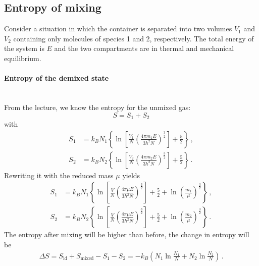 \newpage
\subsection{Entropy of mixing}
    Consider a situation in which the container is separated into two volumes 
    $V_1$ and $V_2$ containing only molecules of species 1 and 2, respectively. 
    The total energy of the system is $E$ and the two compartments are in 
    thermal and mechanical equilibrium. 

\paragraph{Entropy of the demixed state} \ \\
    From the lecture, we know the entropy for the unmixed gas:
    \begin{equation}
        S = S_1 + S_2
    \end{equation}
    with 
    \begin{align}
    S_1 &= k_B N_1 \left\{ \ln\left[ \frac{V_1}{N} \left( \frac{4\pi m_1 E}{3h^2N} \right)^{\frac{3}{2}}  \right] + \frac{5}{2} \right\} \,, \\
    S_2 &= k_B N_2 \left\{ \ln\left[ \frac{V_2}{N} \left( \frac{4\pi m_2 E}{3h^2N} \right)^{\frac{3}{2}}  \right] + \frac{5}{2} \right\} \,.
    \end{align}
    Rewriting it with the reduced mass $\mu$ yields
    \begin{align}
    S_1 &= k_B N_1 \left\{ \ln\left[ \frac{V}{N} \left( \frac{4\pi \mu E}{3h^2N} \right)^{\frac{3}{2}}  \right] + \frac{5}{2} + \ln\left( \frac{m_1}{\mu} \right)^{\frac{3}{2}} \right\} \,, \\
    S_2 &= k_B N_2 \left\{ \ln\left[ \frac{V}{N} \left( \frac{4\pi \mu E}{3h^2N} \right)^{\frac{3}{2}}  \right] + \frac{5}{2} + \ln\left( \frac{m_2}{\mu} \right)^{\frac{3}{2}} \right\} \,.
    \end{align}
    The entropy after mixing will be higher than before, the change in entropy will be
    \begin{align}
    \Delta S = S_{\text{id}} + S_{\text{mixed}} - S_1 - S_2 = - k_B \left( N_1 \ln\frac{N_1}{N} + N_2 \ln\frac{N_2}{N} \right) \,.
    \end{align}
